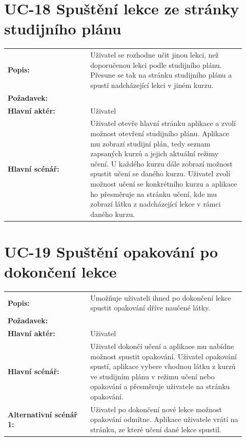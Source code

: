 \section{UC-18 Spuštění lekce ze stránky studijního plánu}\label{sec:uc-18}

\begin{tabular}{p{0.32\linewidth}p{0.6\linewidth}}
  \textbf{Popis:} & Uživatel se rozhodne učit jinou lekci, než doporučenou lekci podle studijního plánu. Přesune se tak na stránku studijního plánu a spustí nadcházející lekci v jiném kurzu. \\
  \textbf{Požadavek:} & \nameref{sec:fp-study-plan-learning} \\
  \textbf{Hlavní aktér:} & Uživatel \\
  \textbf{Hlavní scénář:} & Uživatel otevře hlavní stránku aplikace a zvolí možnost otevření studijního plánu. Aplikace mu zobrazí studijní plán, tedy seznam zapsaných kurzů a jejich aktuální režimy učení. U každého kurzu dále zobrazí možnost spustit učení se daného kurzu. Uživatel zvolí možnost učení se konkrétního kurzu a aplikace ho přesměruje na stránku učení, kde mu zobrazí látku z nadcházející lekce v rámci daného kurzu. \\
\end{tabular}

\section{UC-19 Spuštění opakování po dokončení lekce}\label{sec:uc-19}

\begin{tabular}{p{0.32\linewidth}p{0.6\linewidth}}
  \textbf{Popis:} & Umožňuje uživateli ihned po dokončení lekce spustit opakování dříve naučené látky. \\
  \textbf{Požadavek:} & \nameref{sec:fp-post-lesson-review} \\
  \textbf{Hlavní aktér:} & Uživatel \\
  \textbf{Hlavní scénář:} & Uživatel dokončí učení a aplikace mu nabídne možnost spustit opakování. Uživatel opakování spustí, aplikace vybere vhodnou látku z kurzů ve studijním plánu v režimu učení nebo opakování a přesměruje uživatele na stránku opakování. \\
  \textbf{Alternativní scénář 1:} & Uživatel po dokončení nové lekce možnost opakování odmítne. Aplikace uživatele vrátí na stránku, ze které učení dané lekce spustil. \\
\end{tabular}

